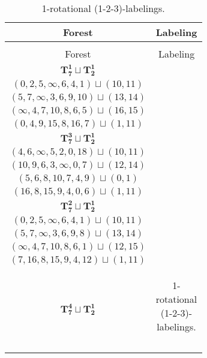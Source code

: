 \documentclass{article}
\begin{document}
    \begin{longtable}{|c|c|}
    \caption{1-rotational (1-2-3)-labelings.}\label{tab:1-rot(1-2-3)} \\
    \hline
    Forest & Labeling \\
    \hline
    \endfirsthead
    \caption{1-rotational (1-2-3)-labelings.}\\ 
    \hline
    Forest & Labeling \\
    \hline
    \endhead

    \hline
    \endfoot
    
    \hline
    \endlastfoot
    \hline
        $\mathbf{T_{7}^{1}} \sqcup \mathbf{T_{2}^{1}}$ & \begin{tabular}{c}
        $(0,1,\infty,2,4,5,3)\sqcup(12,15)$ \\ 
        $(0,2,5,\infty,6,4,1)\sqcup(10,11)$ \\ 
        $(5,7,\infty,3,6,9,10)\sqcup(13,14)$ \\ 
        $(\infty,4,7,10,8,6,5)\sqcup(16,15)$ \\ 
        $(0,4,9,15,8,16,7)\sqcup(1,11)$
        \end{tabular} \\ 
        \hline
        $\mathbf{T_{7}^{3}} \sqcup \mathbf{T_{2}^{1}}$ & \begin{tabular}{c}
        $(3,5,4,2,\infty,8,1)\sqcup(12,15)$ \\ 
        $(4,6,\infty,5,2,0,18)\sqcup(10,11)$ \\ 
        $(10,9,6,3,\infty,0,7)\sqcup(12,14)$ \\ 
        $(5,6,8,10,7,4,9)\sqcup(0,1)$ \\ 
        $(16,8,15,9,4,0,6)\sqcup(1,11)$
        \end{tabular} \\ 
        \hline
        $\mathbf{T_{7}^{2}} \sqcup \mathbf{T_{2}^{1}}$ & \begin{tabular}{c}
        $(3,5,4,2,\infty,1,6)\sqcup(9,10)$ \\ 
        $(0,2,5,\infty,6,4,1)\sqcup(10,11)$ \\ 
        $(5,7,\infty,3,6,9,8)\sqcup(13,14)$ \\ 
        $(\infty,4,7,10,8,6,1)\sqcup(12,15)$ \\ 
        $(7,16,8,15,9,4,12)\sqcup(1,11)$
        \end{tabular} \\ 
        \hline
        $\mathbf{T_{7}^{4}} \sqcup \mathbf{T_{2}^{1}}$ & \begin{tabular}{c}

\end{tabular}
\end{longtable}
\end{document}
